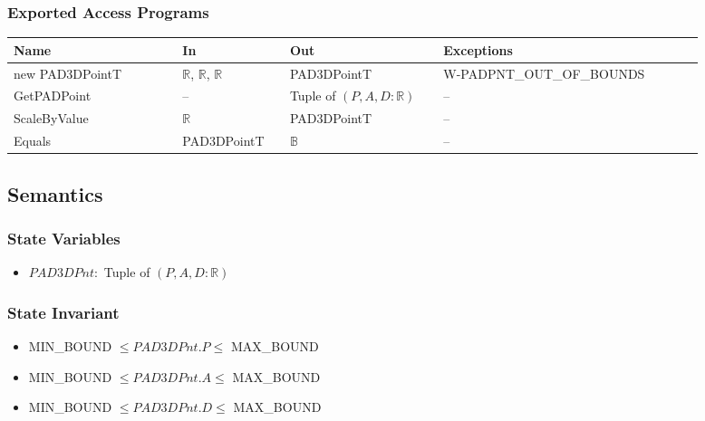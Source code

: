 \subsubsection{Exported Access Programs}

\begin{center}
    \renewcommand{\arraystretch}{1.2}
    \begin{tabular}{m{0.22\linewidth} m{0.14\linewidth} m{0.2\linewidth}
    m{0.34\linewidth}}
        \toprule
        \textbf{Name} & \textbf{In} & \textbf{Out} & \textbf{Exceptions} \\
        \midrule

        \rowcolor[gray]{0.9}new PAD3DPointT & $\mathbb{R}$, $\mathbb{R}$,
        $\mathbb{R}$ & PAD3DPointT & W-PADPNT\_OUT\_OF\_BOUNDS \\

        GetPADPoint & -- & Tuple of $\left( P, A, D : \mathbb{R} \right)$ & --
        \\

        \rowcolor[gray]{0.9}ScaleByValue & $\mathbb{R}$ & PAD3DPointT & -- \\

        Equals & PAD3DPointT & $\mathbb{B}$ & -- \\

        \bottomrule
    \end{tabular}
\end{center}

\subsection{Semantics}

\subsubsection{State Variables}

\begin{itemize}

    \item $\mathit{PAD3DPnt} : $ Tuple of $\left( P, A, D : \mathbb{R} \right)$

\end{itemize}

\subsubsection{State Invariant}
\begin{itemize}

    \item MIN\_BOUND $ \leq \mathit{PAD3DPnt}.P \leq $ MAX\_BOUND

    \item MIN\_BOUND $ \leq \mathit{PAD3DPnt}.A \leq $ MAX\_BOUND

    \item MIN\_BOUND $ \leq \mathit{PAD3DPnt}.D \leq $ MAX\_BOUND

\end{itemize}

